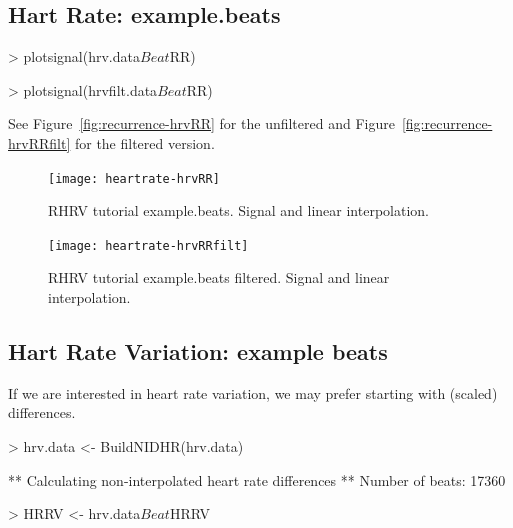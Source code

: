 \documentclass[a4paper, english, utf8]{amsart}
\newcommand{\figref}[1]{Figure\ \vref{#1}}
\begin{document}
\subsection{Hart Rate: example.beats}

\begin{Schunk}
\begin{Sinput}
> plotsignal(hrv.data$Beat$RR)
\end{Sinput}
\end{Schunk}
\begin{Schunk}
\begin{Sinput}
> plotsignal(hrvfilt.data$Beat$RR)
\end{Sinput}
\end{Schunk}

See \figref{fig:recurrence-hrvRR} for the unfiltered and \figref{fig:recurrence-hrvRRfilt} for the filtered version.

\begin{figure}[htbp]
\begin{center}
\texttt{[image: heartrate-hrvRR]}
\caption{RHRV tutorial example.beats. Signal and linear interpolation.}
\label{fig:recurrence-hrvRR}
\end{center}
\end{figure}

\begin{figure}[htbp]
\begin{center}
\texttt{[image: heartrate-hrvRRfilt]}
\caption{RHRV tutorial example.beats  filtered. Signal and linear interpolation.}
\label{fig:recurrence-hrvRRfilt}
\end{center}
\end{figure}


\subsection{Hart Rate Variation: example beats}

If we are interested in heart rate variation, we may prefer starting with (scaled) differences.

\begin{Schunk}
\begin{Sinput}
> hrv.data <- BuildNIDHR(hrv.data)
\end{Sinput}
\begin{Soutput}
** Calculating non-interpolated heart rate differences **
   Number of beats: 17360 
\end{Soutput}
\begin{Sinput}
> HRRV <- hrv.data$Beat$HRRV
\end{Sinput}
\end{Schunk}
\end{document}
